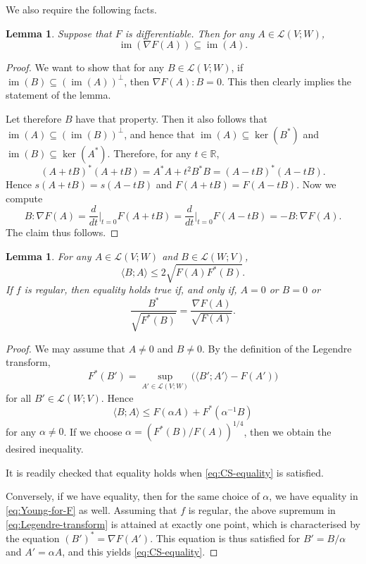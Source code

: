 \documentclass[10pt,a4paper]{amsart}
\newcommand{\R}{\mathbb{R}}
\newcommand{\Lin}{\mathcal{L}}
\DeclareMathOperator{\im}{im}
\newcommand{\pairing}[2]{\langle #1; #2 \rangle}
\newtheorem{lemma}[theorem]{Lemma}
\begin{document}
We also require the following facts.

\begin{lemma} \label{lem:images}
Suppose that $F$ is differentiable. Then for any $A \in \Lin(V; W)$,
\[
\im(\nabla F(A)) \subseteq \im(A).
\]
\end{lemma}

\begin{proof}
We want to show that for any $B \in \Lin(V; W)$, if
$\im(B) \subseteq (\im(A))^\perp$, then $\nabla F(A) : B = 0$.
This then clearly implies the statement of the lemma.

Let therefore $B$ have that property. Then it also follows that
$\im(A) \subseteq (\im(B))^\perp$, and hence
that $\im(A) \subseteq \ker(B^*)$ and $\im(B) \subseteq \ker(A^*)$.
Therefore, for any $t \in \R$,
\[
(A + tB)^* (A + tB) = A^* A + t^2 B^* B = (A - tB)^* (A - tB).
\]
Hence $s(A + tB) = s(A - tB)$ and $F(A + tB) = F(A - tB)$. Now we compute
\[
B : \nabla F(A) = \frac{d}{dt}\Bigr|_{t = 0} F(A + tB) = \frac{d}{dt}\Bigr|_{t = 0} F(A - tB) = - B : \nabla F(A).
\]
The claim thus follows.
\end{proof}

\begin{lemma} \label{lem:Cauchy-Schwarz-generalisation}
For any $A \in \Lin(V; W)$ and $B \in \Lin(W; V)$,
\[
\pairing{B}{A} \le 2\sqrt{F(A) F^*(B)}.
\]
If $f$ is regular, then equality holds true if, and only if, $A = 0$ or $B = 0$ or
\begin{equation} \label{eq:CS-equality}
\frac{B^*}{\sqrt{F^*(B)}} = \frac{\nabla F(A)}{\sqrt{F(A)}}.
\end{equation}
\end{lemma}

\begin{proof}
We may assume that $A \neq 0$ and $B \neq 0$. By the definition of the Legendre transform,
\begin{equation} \label{eq:Legendre-transform}
F^*(B') = \sup_{A' \in \Lin(V; W)} \bigl(\pairing{B'}{A'} - F(A')\bigr)
\end{equation}
for all $B' \in \Lin(W; V)$. Hence
\begin{equation} \label{eq:Young-for-F}
\pairing{B}{A} \le F(\alpha A) + F^*(\alpha^{-1} B)
\end{equation}
for any $\alpha \neq 0$. If we choose $\alpha = (F^*(B)/F(A))^{1/4}$, then we obtain the desired inequality.

It is readily checked that equality holds when \eqref{eq:CS-equality} is satisfied.

Conversely, if we have equality, then for the same choice of $\alpha$, we have equality in \eqref{eq:Young-for-F} as well.
Assuming that $f$ is regular, the above supremum in \eqref{eq:Legendre-transform} is attained at exactly one point, which is characterised by
the equation $(B')^* = \nabla F(A')$. This equation is thus satisfied for $B' = B/\alpha$ and $A' = \alpha A$,
and this yields \eqref{eq:CS-equality}.
\end{proof}
\end{document}
